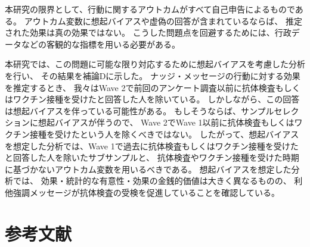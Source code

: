 \documentclass[
  11pt,
  a4paper,
]{article}
\begin{document}
本研究の限界として、行動に関するアウトカムがすべて自己申告によるものである。
アウトカム変数に想起バイアスや虚偽の回答が含まれているならば、
推定された効果は真の効果ではない。
こうした問題点を回避するためには、行政データなどの客観的な指標を用いる必要がある。

本研究では、この問題に可能な限り対応するために想起バイアスを考慮した分析を行い、
その結果を補論Dに示した。
ナッジ・メッセージの行動に対する効果を推定するとき、
我々はWave 2で前回のアンケート調査以前に抗体検査もしくはワクチン接種を受けたと回答した人を除いている。
しかしながら、この回答は想起バイアスを伴っている可能性がある。
もしそうならば、サンプルセレクションに想起バイアスが伴うので、
Wave 2でWave 1以前に抗体検査もしくはワクチン接種を受けたという人を除くべきではない。
したがって、想起バイアスを想定した分析では、Wave 1で過去に抗体検査もしくはワクチン接種を受けたと回答した人を除いたサブサンプルと、
抗体検査やワクチン接種を受けた時期に基づかないアウトカム変数を用いるべきである。
想起バイアスを想定した分析では、
効果・統計的な有意性・効果の金銭的価値は大きく異なるものの、
利他強調メッセージが抗体検査の受検を促進していることを確認している。

\newpage

\hypertarget{ux53c2ux8003ux6587ux732e}{%
\section*{参考文献}\label{ux53c2ux8003ux6587ux732e}}
\end{document}
